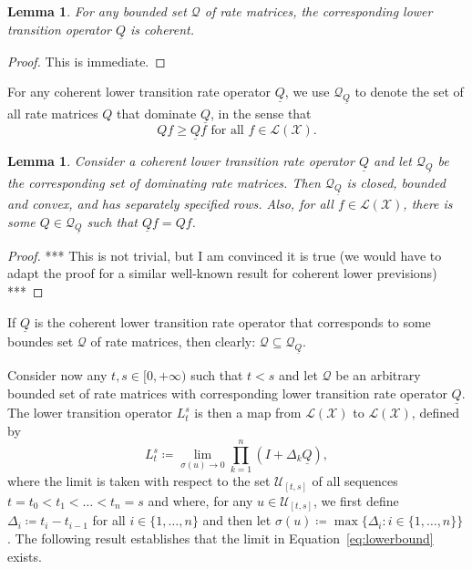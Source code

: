 \documentclass[a4paper,reqno]{amsart}
\newtheorem{lemma}[theorem]{Lemma}
\newcommand{\states}{\mathcal{X}}
\newcommand{\lbound}{L}
\newcommand{\gambles}{\mathcal{L}}
\newcommand{\gamblesX}{\gambles(\states)}
\newcommand{\rateset}{\mathcal{Q}}
\newcommand{\lrate}{\underline{Q}}
\begin{document}
\begin{lemma}\label{lemma:lrateiscoherent}
For any bounded set $\rateset$ of rate matrices, the corresponding lower transition operator $\lrate$ is coherent.
\end{lemma}
\begin{proof}
This is immediate.
\end{proof}

For any coherent lower transition rate operator $\lrate$, we use $\rateset_{\lrate}$ to denote the set of all rate matrices $Q$ that dominate $\lrate$, in the sense that
\begin{equation*}
Qf\geq\lrate f\text{ for all $f\in\gamblesX$.}
\end{equation*}

\begin{lemma}
Consider a coherent lower transition rate operator $\lrate$ and let $\rateset_{\lrate}$ be the corresponding set of dominating rate matrices. Then $\rateset_{\lrate}$ is closed, bounded and convex, and has separately specified rows. Also, for all $f\in\gamblesX$, there is some $Q\in\rateset_{\lrate}$ such that $\lrate f=Qf$.
\end{lemma}
\begin{proof}
*** This is not trivial, but I am convinced it is true (we would have to adapt the proof for a similar well-known result for coherent lower previsions) ***
\end{proof}

\noindent
If $\lrate$ is the coherent lower transition rate operator that corresponds to some boundes set $\rateset$ of rate matrices, then clearly: $\rateset\subseteq\rateset_{\lrate}$.

Consider now any $t,s\in[0,+\infty)$ such that $t<s$ and let $\rateset$ be an arbitrary bounded set of rate matrices with corresponding lower transition rate operator $\lrate$. The lower transition operator $\lbound_t^s$ is then a map from $\gamblesX$ to $\gamblesX$, defined by
\begin{equation}\label{eq:lowerbound}
\lbound_t^s\coloneqq\lim_{\sigma(u)\to0}\prod_{k=1}^n(I+\Delta_k\lrate),
\end{equation}
where the limit is taken with respect to the set $\mathcal{U}_{[t,s]}$ of all sequences $t=t_0<t_1<\dots<t_n=s$ and where, for any $u\in\mathcal{U}_{[t,s]}$, we first define $\Delta_i\coloneqq t_i-t_{i-1}$ for all $i\in\{1,\dots,n\}$ and then let $\sigma(u)\coloneqq\max\{\Delta_i\colon i\in\{1,\dots,n\}\}$. The following result establishes that the limit in Equation~\eqref{eq:lowerbound} exists.
\end{document}
